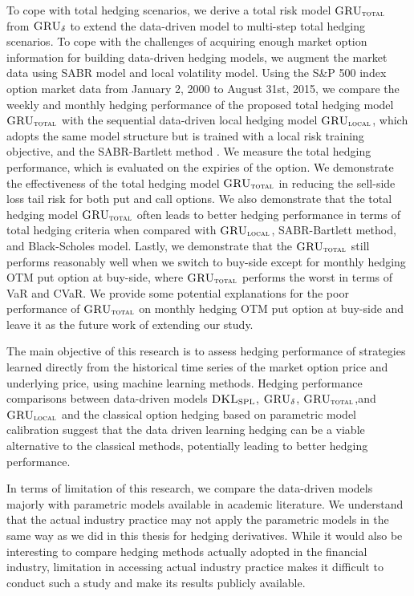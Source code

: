 \documentclass[letterpaper,12pt,titlepage,oneside,final]{book}
\numberwithin{equation}{section}
\theoremstyle{definition}
\newcommand{\model}{\textsc{GRU}_\delta}
\newcommand{\modelT}{\textsc{GRU}_{\textsc{total}}}
\newcommand{\modelL}{\textsc{GRU}_{\textsc{local}}}
\newcommand{\DKLs}{\bf\textsc{DKL}_{\text{SPL}}}
\begin{document}
To cope with total hedging scenarios, we derive a total risk model $\modelT$ from $\model$ to extend the data-driven model to multi-step total hedging scenarios.  To cope with the challenges of acquiring enough market option information for building data-driven hedging models,  we augment the market data using SABR model and local volatility model. Using the S\&P 500 index  option market data from January 2, 2000 to  August 31st, 2015, we compare  the weekly and monthly hedging performance of the proposed total hedging model $\modelT$  with the sequential data-driven local hedging model $\modelL$, which adopts the same model structure but is trained with a local risk training objective, and the SABR-Bartlett method \cite{bartlett2006hedging}. We measure the total hedging performance, which is evaluated on the expiries of the option. We demonstrate the effectiveness of the total hedging model $\modelT$ in reducing the sell-side loss tail risk for both put and call options. We also demonstrate that the  total hedging model $\modelT$ often leads to better hedging performance in terms of total hedging criteria when compared with $\modelL$,  SABR-Bartlett method, and Black-Scholes model.  Lastly, we demonstrate that the $\modelT$ still performs reasonably well when we switch to buy-side except for monthly hedging OTM put option at buy-side, where $\modelT$ performs the worst in terms of VaR and CVaR.  We  provide some potential explanations for the poor performance of $\modelT$ on monthly hedging OTM put option at buy-side and leave it as the future work of extending our study.


The main objective of this research  is to assess hedging performance of strategies learned  directly from the  historical time series of the market option price and underlying price,  using machine learning methods. Hedging  performance comparisons between data-driven  models $\DKLs$, $\model$, $\modelT$,and  $\modelL$ and the  classical  option hedging based on parametric model calibration suggest that the data driven  learning hedging can be a viable alternative to the classical methods,  potentially leading to better hedging performance.  

In terms of limitation of this research, we compare the data-driven models majorly with parametric models available in academic literature.  We understand that the actual industry practice may not apply the parametric models in the same way as we did in this thesis for hedging derivatives.
While it would also  be interesting to compare hedging methods actually adopted in the financial industry,   limitation in accessing actual industry practice makes it difficult to conduct such a study and make its results publicly available.
\end{document}
